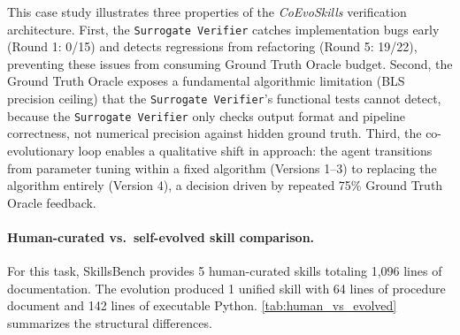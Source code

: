 \documentclass{article}
\newcommand{\method}{\textit{CoEvoSkills}\xspace}
\newcommand{\bench}{SkillsBench\xspace}
\begin{document}
This case study illustrates three properties of the \method verification architecture. First, the \texttt{Surrogate Verifier} catches implementation bugs early (Round 1: 0/15) and detects regressions from refactoring (Round 5: 19/22), preventing these issues from consuming Ground Truth Oracle budget. Second, the Ground Truth Oracle exposes a fundamental algorithmic limitation (BLS precision ceiling) that the \texttt{Surrogate Verifier}'s functional tests cannot detect, because the \texttt{Surrogate Verifier} only checks output format and pipeline correctness, not numerical precision against hidden ground truth. Third, the co-evolutionary loop enables a qualitative shift in approach: the agent transitions from parameter tuning within a fixed algorithm (Versions 1--3) to replacing the algorithm entirely (Version 4), a decision driven by repeated 75\% Ground Truth Oracle feedback.

\paragraph{Human-curated vs.\ self-evolved skill comparison.}
For this task, \bench provides 5 human-curated skills totaling 1,096 lines of documentation. The evolution produced 1 unified skill with 64 lines of procedure document and 142 lines of executable Python. \autoref{tab:human_vs_evolved} summarizes the structural differences.

\begin{table}[ht!]
\centering
\caption{Structural comparison between human-curated and self-evolved skills for the exoplanet transit detection task.}
\label{tab:human_vs_evolved}
\small
{}
\end{table}
\end{document}
